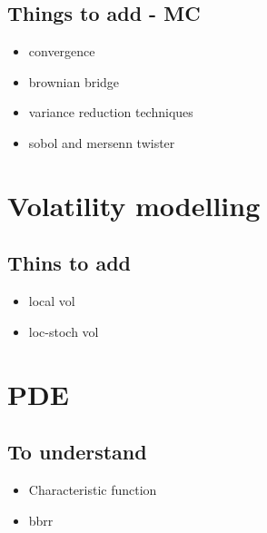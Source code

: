 \documentclass{report}
\begin{document}
\chapter{Things to add - MC}
\begin{itemize}
	\item convergence
	\item brownian bridge
	\item variance reduction techniques
	\item sobol and mersenn twister
\end{itemize}

\part{Volatility modelling}

\chapter{Thins to add}
\begin{itemize}
	\item local vol
	\item loc-stoch vol
\end{itemize}

\part{PDE}

\chapter{To understand}
\begin{itemize}
	\item Characteristic function
	\item bbrr
\end{itemize}
\end{document}
